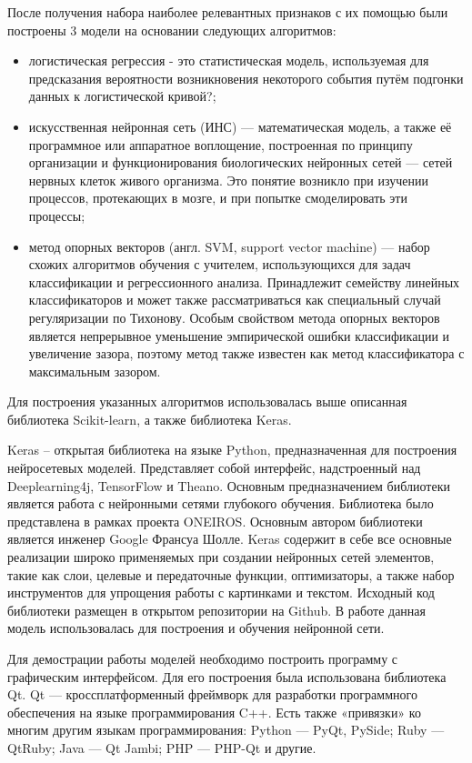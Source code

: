 После получения набора наиболее релевантных признаков с их помощью были построены 3 модели на основании следующих алгоритмов:
\begin{itemize}
\item
логистическая регрессия - это статистическая модель, используемая для предсказания вероятности возникновения некоторого события путём подгонки данных к логистической кривой?;
\item
искусственная нейронная сеть (ИНС) — математическая модель, а также её программное или аппаратное воплощение, построенная по принципу организации и функционирования биологических нейронных сетей — сетей нервных клеток живого организма. Это понятие возникло при изучении процессов, протекающих в мозге, и при попытке смоделировать эти процессы;
\item
метод опорных векторов (англ. SVM, support vector machine) — набор схожих алгоритмов обучения с учителем, использующихся для задач классификации и регрессионного анализа. Принадлежит семейству линейных классификаторов и может также рассматриваться как специальный случай регуляризации по Тихонову. Особым свойством метода опорных векторов является непрерывное уменьшение эмпирической ошибки классификации и увеличение зазора, поэтому метод также известен как метод классификатора с максимальным зазором.
\end{itemize}

Для построения указанных алгоритмов использовалась выше описанная библиотека Scikit-learn, а также библиотека Keras.

Keras – открытая библиотека на языке Python, предназначенная для построения нейросетевых моделей. Представляет собой интерфейс, надстроенный над Deeplearning4j, TensorFlow и Theano. Основным предназначением библиотеки является работа с нейронными сетями глубокого обучения. Библиотека было представлена в рамках проекта ONEIROS. Основным автором библиотеки является инженер Google Франсуа Шолле. Keras содержит в себе все основные реализации широко применяемых при создании нейронных сетей элементов, такие как слои, целевые и передаточные функции, оптимизаторы, а также набор инструментов для упрощения работы с картинками и текстом. Исходный код библиотеки размещен в открытом репозитории на Github. В работе данная модель использовалась для построения и обучения нейронной сети.

Для демострации работы моделей необходимо построить программу с графическим интерфейсом. Для его построения была использована библиотека Qt. Qt — кроссплатформенный фреймворк для разработки программного обеспечения на языке программирования C++. Есть также «привязки» ко многим другим языкам программирования: Python — PyQt, PySide; Ruby — QtRuby; Java — Qt Jambi; PHP — PHP-Qt и другие.

